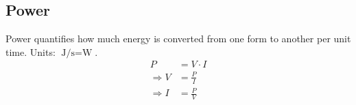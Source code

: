 \documentclass{pgslides}
\begin{document}

\subsection{Power}

\begin{frame}{\insertsubsectionhead}
Power quantifies how much energy is converted from one form to another per unit time. Units: $\si{\joule\per\second} = \si{\watt}$.
\begin{align}
  P & = V \cdot I \label{eq:power-P} \\
  \Rightarrow V & = \frac{P}{I} \label{eq:power-V} \\
  \Rightarrow I & = \frac{P}{V} \label{eq:power-I} 
\end{align}
\end{frame}


\end{document}
